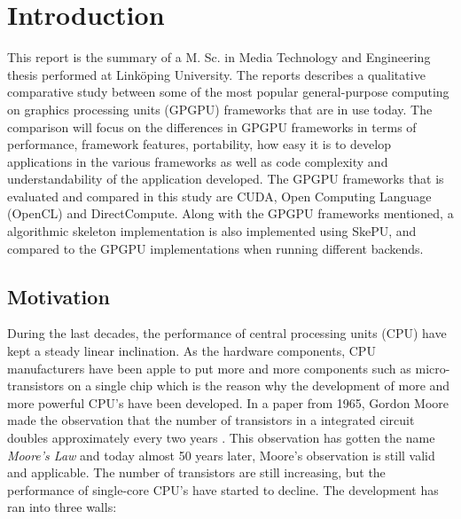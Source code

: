 
\chapter{Introduction}  %
This report is the summary of a M. Sc. in Media Technology and Engineering thesis performed at Linköping University. The reports describes a qualitative comparative study between some of the most popular general-purpose computing on graphics processing units (GPGPU) frameworks that are in use today. The comparison will focus on the differences in GPGPU frameworks in terms of performance, framework features, portability, how easy it is to develop applications in the various frameworks as well as code complexity and understandability of the application developed. The GPGPU frameworks that is evaluated and compared in this study are CUDA, Open Computing Language (OpenCL) and DirectCompute. Along with the GPGPU frameworks mentioned, a algorithmic skeleton implementation is also implemented using SkePU, and compared to the GPGPU implementations when running different backends.


\section{Motivation} \label{sec:IntroductionMotivation}
During the last decades, the performance of central processing units (CPU) have kept a steady linear inclination. As the hardware components, CPU manufacturers have been apple to put more and more components such as micro-transistors on a single chip which is the reason why the development of more and more powerful CPU's have been developed. In a paper from 1965, Gordon Moore made the observation that the number of transistors in a integrated circuit doubles approximately every two years \cite{MooresLaw}. This observation has gotten the name \textit{Moore's Law} and today almost 50 years later, Moore's observation is still valid and applicable. The number of transistors are still increasing, but the performance of single-core CPU's have started to decline. The development has ran into three walls:

